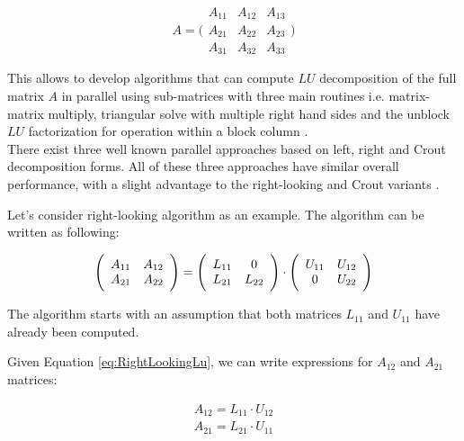 $$
A = 
\Bigg(\begin{array}{c|c|c}
A_{11} & A_{12} & A_{13} \\ \hline
A_{21} & A_{22} & A_{23} \\ \hline
A_{31} & A_{32} & A_{33}
\end{array}\Bigg)
$$

This allows to develop algorithms that can compute $LU$ decomposition of the full matrix $A$ in parallel using sub-matrices with three main routines i.e. matrix-matrix multiply, triangular solve with multiple right hand sides and the unblock $LU$ factorization for operation within a block column \cite{netlib:lapack-1}.\\

There exist three well known parallel approaches based on left, right and Crout decomposition forms. All of these three approaches have similar overall performance, with a slight advantage to the right-looking and Crout variants \cite{netlib:lapack-1}. 


Let's consider right-looking algorithm as an example. The algorithm can be written as following:

\begin{equation} \label{eq:RightLookingLu}
\Bigg(\begin{array}{c c}
A_{11} & A_{12} \\
A_{21} & A_{22} \\
\end{array}\Bigg)
=
\Bigg(\begin{array}{c c}
L_{11} & 0 \\
L_{21} & L_{22} \\
\end{array}\Bigg)
\cdot
\Bigg(\begin{array}{c c}
U_{11} & U_{12} \\
0 & U_{22} \\
\end{array}\Bigg)
\end{equation}

The algorithm starts with an assumption that both matrices $L_{11}$ and $U_{11}$ have already been computed. 

Given Equation \ref{eq:RightLookingLu}, we can write expressions for $A_{12}$ and $A_{21}$ matrices:

\begin{align} \label{eq:RightLookingLuFirstUpdate}
A_{12} = L_{11} \cdot U_{12} \\
A_{21} = L_{21} \cdot U_{11}
\end{align}

